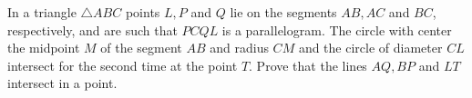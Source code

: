 In a triangle $\triangle ABC$ points $L, P$ and $Q$ lie on the segments $AB, AC$ and $BC$, respectively, and are such that $PCQL$ is a parallelogram. The circle with center the midpoint $M$ of the segment $AB$ and radius $CM$ and the circle of diameter $CL$ intersect for the second time at the point $T$. Prove that the lines $AQ, BP$ and $LT$ intersect in a point.